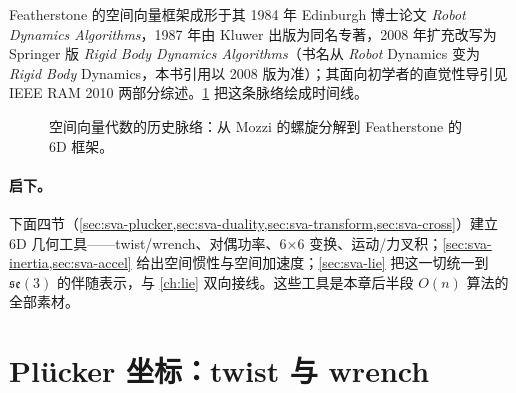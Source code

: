 Featherstone 的空间向量框架成形于其 1984 年 Edinburgh 博士论文 \emph{Robot Dynamics Algorithms}，1987 年由 Kluwer 出版为同名专著\cite{featherstone1987robot}，2008 年扩充改写为 Springer 版 \emph{Rigid Body Dynamics Algorithms}\cite{featherstone2008rigid}（书名从 \emph{Robot} Dynamics 变为 \emph{Rigid Body} Dynamics，本书引用以 2008 版为准）；其面向初学者的直觉性导引见 IEEE RAM 2010 两部分综述\cite{featherstone2010beginner}。\cref{fig:sva-timeline} 把这条脉络绘成时间线。

\begin{figure}[ht]
\centering
{}
\caption{空间向量代数的历史脉络：从 Mozzi 的螺旋分解到 Featherstone 的 6D 框架。}
\label{fig:sva-timeline}
\end{figure}

\paragraph{启下。}
下面四节（\cref{sec:sva-plucker,sec:sva-duality,sec:sva-transform,sec:sva-cross}）建立 6D 几何工具——twist/wrench、对偶功率、6×6 变换、运动/力叉积；\cref{sec:sva-inertia,sec:sva-accel} 给出空间惯性与空间加速度；\cref{sec:sva-lie} 把这一切统一到 $\mathfrak{se}(3)$ 的伴随表示，与 \cref{ch:lie} 双向接线。这些工具是本章后半段 $O(n)$ 算法的全部素材。

\section{Plücker 坐标：twist 与 wrench}
\label{sec:sva-plucker}

